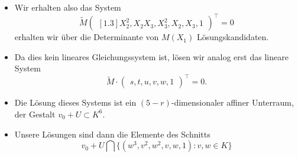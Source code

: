 \documentclass[11pt]{beamer}
\theoremstyle{custom}
\theoremstyle{custom}
\begin{document}
	\begin{frame}
		\begin{itemize}
			\item Wir erhalten also das System
			\begin{equation*}
			\tilde{M}\begin{pmatrix}[1.3]
				X_{2}^2,
				X_{2}X_{3},
				X_{3}^2,
				X_{2},
				X_{3},
				1
			\end{pmatrix}^{\top} =0
			\end{equation*}
			erhalten wir über die Determinante von $M(X_{1})$ Lösungskandidaten.
			\item Da dies kein lineares Gleichungssystem ist, lösen wir analog erst das lineare System
			\begin{equation*}\label{eqn:low_rank_system_ind}
				\tilde{M} \cdot\begin{pmatrix}
					s,
					t,
					u,
					v,
					w,
					1
				\end{pmatrix}^\top
				=0.
			\end{equation*}
			\item Die Lösung dieses Systems ist ein $(5-r)$-dimensionaler affiner Unterraum, der Gestalt ${v_0 + U \subset K^6}$.
			\item Unsere Lösungen sind dann die Elemente des Schnitts \begin{equation*}
				v_0 + U \bigcap \{(w^3,v^2,w^2,v,w,1) : v,w \in K\}
			\end{equation*}
		\end{itemize}
	\end{frame}
\end{document}

